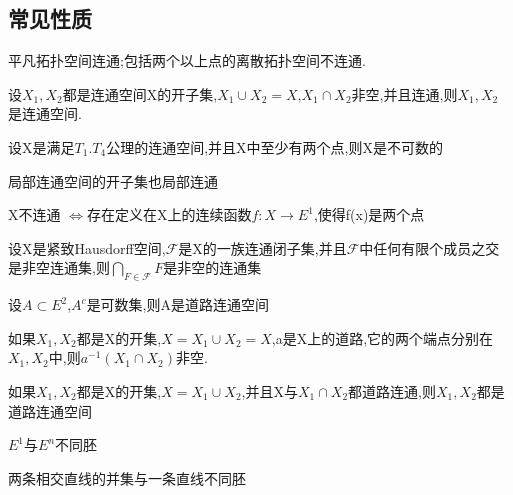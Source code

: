 \subsection*{常见性质}
\begin{theorem}
    平凡拓扑空间连通;包括两个以上点的离散拓扑空间不连通.
\end{theorem}
\begin{theorem}
    设\(X_1,X_2\)都是连通空间X的开子集,\(X_1 \cup X_2 = X\),\(X_1 \cap X_2\)非空,并且连通,则\(X_1,X_2\)是连通空间.
\end{theorem}
\begin{theorem}
    设X是满足\(T_1.T_4\)公理的连通空间,并且X中至少有两个点,则X是不可数的
\end{theorem}
\begin{theorem}
    局部连通空间的开子集也局部连通
\end{theorem}
\begin{theorem}
    X不连通 \(\Leftrightarrow \)存在定义在X上的连续函数\(f : X \rightarrow E^1\),使得f(x)是两个点
\end{theorem}
\begin{theorem}
    设X是紧致Hausdorff空间,\(\mathscr{F}\)是X的一族连通闭子集,并且\(\mathscr{F}\)中任何有限个成员之交是非空连通集,则\(\bigcap\limits_{F \in \mathscr{F}} F\)是非空的连通集
\end{theorem}
\begin{theorem}
    设\(A \subset E^2\),\(A^{c}\)是可数集,则A是道路连通空间
\end{theorem}
\begin{theorem}
    如果\(X_1 ,X_2\)都是X的开集,\(X= X_1 \cup X_2 = X \),a是X上的道路,它的两个端点分别在\(X_1 , X_2\)中,则\(a^{-1}(X_1 \cap X_2)\)非空.   
\end{theorem}
\begin{theorem}
    如果\(X_1 ,X_2\)都是X的开集,\(X = X_1 \cup X_2\),并且X与\(X_1 \cap X_2\)都道路连通,则\(X_1 , X_2\)都是道路连通空间
\end{theorem}
\begin{theorem}
    \(E^1\)与\(E^n\)不同胚
\end{theorem}
\begin{theorem}
    两条相交直线的并集与一条直线不同胚
\end{theorem}
